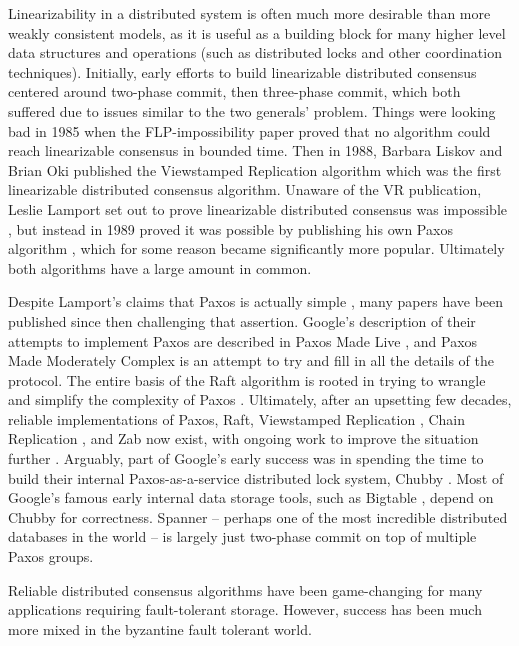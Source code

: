 \documentclass[8pt,fleqn,openany]{book}
\begin{document}
Linearizability in a distributed system is often much more desirable than more
weakly consistent models, as it is
useful as a building block for many higher level data structures and operations
(such as distributed locks and other coordination techniques). Initially, early
efforts to build linearizable distributed consensus centered around two-phase
commit, then three-phase commit, which both
suffered due to issues similar to the two generals' problem. Things were looking
bad in 1985 when the FLP-impossibility paper \cite{flp} proved that no algorithm
could reach linearizable consensus in bounded time. Then in 1988, Barbara Liskov
and Brian Oki published the Viewstamped Replication algorithm \cite{vr} which
was the first linearizable distributed consensus algorithm. Unaware of the VR
publication, Leslie Lamport set out to prove linearizable distributed consensus
was impossible \cite{paxos-note}, but instead in 1989 proved it was possible by
publishing his own Paxos algorithm \cite{paxos}, which for some reason became
significantly more popular. Ultimately both algorithms have a large amount in
common.

Despite Lamport's claims that Paxos is actually simple \cite{paxos-simple},
many papers have been published since then
challenging that assertion. Google's description of their attempts to implement
Paxos are described in Paxos Made Live \cite{paxos-live},
and Paxos Made Moderately
Complex \cite{paxos-complex} is an attempt to try and fill in all the details of
the protocol. The entire basis of the Raft algorithm is rooted in trying to
wrangle and simplify the complexity of Paxos \cite{raft}. Ultimately, after an
upsetting few decades, reliable implementations of Paxos, Raft, Viewstamped
Replication \cite{vrr}, Chain Replication \cite{chain-rep}, and Zab \cite{zab}
now exist, with ongoing work to improve the situation
further \cite{epaxos,paxos-flexible}. Arguably, part of Google's early success
was in spending the time to build their internal Paxos-as-a-service distributed
lock system, Chubby \cite{chubby}. Most of Google's famous early internal data
storage tools, such as Bigtable \cite{bigtable}, depend on Chubby for
correctness. Spanner \cite{spanner} -- perhaps one of the most incredible
distributed databases in the world -- is largely just two-phase commit on top of
multiple Paxos groups.

Reliable distributed consensus algorithms have been game-changing for many
applications requiring fault-tolerant storage. However, success has been much
more mixed in the byzantine fault tolerant world.
\end{document}
